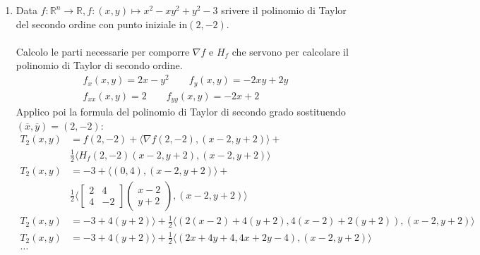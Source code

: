 \documentclass{article}
\begin{document}
\begin{enumerate}
  \item Data $f: \mathbb{R}^n \to \mathbb{R}, f: (x, y) \mapsto x^2 - xy^2 + y^2 - 3$
    srivere il polinomio di Taylor del secondo ordine con punto iniziale in$(2, -2)$. \\ \\
    Calcolo le parti necessarie per comporre $\nabla f$ e $H_f$ che servono per
    calcolare il polinomio di Taylor di secondo ordine.
    \begin{align*}
      f_x(x,y) = 2x-y^2 \qquad f_y(x,y) = -2xy + 2y \\
      f_{xx}(x,y) = 2 \qquad f_{yy}(x,y) = -2x + 2
    \end{align*}
    Applico poi la formula del polinomio di Taylor di secondo grado sostituendo $(\overline{x},
    \overline{y}) = (2, -2)$:
    \begin{align*}
      T_2(x,y) &= f(2, -2) + \langle \nabla f(2, -2), (x-2, y+2) \rangle + \\
      &\frac{1}{2} \langle H_f(2, -2) (x-2, y+2), (x-2, y+2) \rangle \\
      T_2(x,y) &= -3 + \langle (0, 4), (x-2, y+2) \rangle + \\
      &\frac{1}{2} \langle \begin{bmatrix}2 & 4 \\ 4 & -2 \end{bmatrix} \begin{pmatrix}x-2 \\ y+2\end{pmatrix}, (x-2, y+2) \rangle \\
      T_2(x,y) &= -3 + 4(y+2) \rangle + \frac{1}{2} \langle (2(x-2)+4(y+2), 4(x-2)+2(y+2)), (x-2, y+2) \rangle \\
      T_2(x,y) &= -3 + 4(y+2) \rangle + \frac{1}{2} \langle (2x+4y+4, 4x+2y-4), (x-2, y+2) \rangle \\
      \ldots
    \end{align*}
\end{enumerate}
\end{document}
